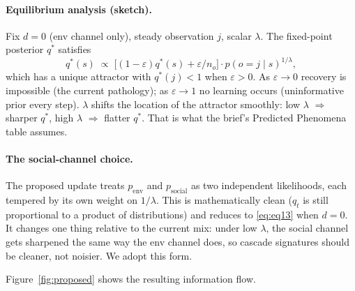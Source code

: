 \documentclass[11pt,a4paper]{article}
\begin{document}
\paragraph{Equilibrium analysis (sketch).} Fix $d=0$ (env channel only),
steady observation $j$, scalar $\lambda$. The fixed-point posterior $q^*$
satisfies
\[
q^*(s) \;\propto\; \bigl[(1-\varepsilon)q^*(s) + \varepsilon/n_o\bigr]
                   \cdot p(o = j \mid s)^{1/\lambda},
\]
which has a unique attractor with $q^*(j) < 1$ when $\varepsilon > 0$. As
$\varepsilon \to 0$ recovery is impossible (the current pathology); as
$\varepsilon \to 1$ no learning occurs (uninformative prior every step).
$\lambda$ shifts the location of the attractor smoothly: low $\lambda$
$\Rightarrow$ sharper $q^*$, high $\lambda$ $\Rightarrow$ flatter $q^*$.
That is what the brief's Predicted Phenomena table assumes.

\paragraph{The social-channel choice.} The proposed update treats
$p_{\text{env}}$ and $p_{\text{social}}$ as two independent likelihoods, each
tempered by its own weight on $1/\lambda$. This is mathematically clean
($q_t$ is still proportional to a product of distributions) and reduces to
\eqref{eq:eq13} when $d = 0$. It changes one thing relative to the current
mix: under low $\lambda$, the social channel gets sharpened the same way the
env channel does, so cascade signatures should be cleaner, not noisier. We
adopt this form.

\medskip
Figure~\ref{fig:proposed} shows the resulting information flow.
\end{document}
